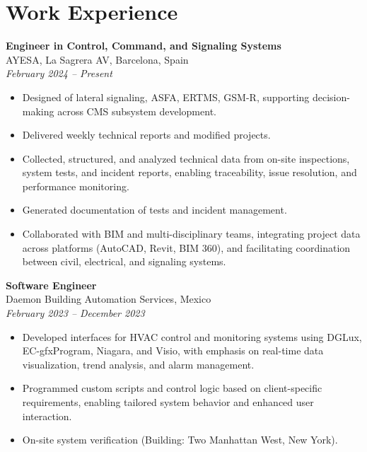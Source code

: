 \documentclass[11pt,a4paper]{article}
\begin{document}
\begin{minipage}[t]{0.65\textwidth}
\justifying

\vspace*{-14.5em}

\section*{Work Experience}
\footnotesize

\textbf{Engineer in Control, Command, and Signaling Systems} \\
AYESA, La Sagrera AV, Barcelona, Spain \\
\textit{February 2024 -- Present}
\begin{itemize}
    \item Designed of lateral signaling, ASFA, ERTMS, GSM-R, supporting decision-making across CMS subsystem development.
    \item Delivered weekly technical reports and modified projects.
    \item Collected, structured, and analyzed technical data from on-site inspections, system tests, and incident reports, enabling traceability, issue resolution, and performance monitoring.
    \item Generated documentation of tests and incident management.
    \item Collaborated with BIM and multi-disciplinary teams, integrating project data across platforms (AutoCAD, Revit, BIM 360), and facilitating coordination between civil, electrical, and signaling systems.
\end{itemize}

\vspace{1em}

\textbf{Software Engineer} \\
Daemon Building Automation Services, Mexico \\
\textit{February 2023 -- December 2023}
\begin{itemize}
    \item Developed interfaces for HVAC control and monitoring systems using DGLux, EC-gfxProgram, Niagara, and Visio, with emphasis on real-time data visualization, trend analysis, and alarm management.
    \item Programmed custom scripts and control logic based on client-specific requirements, enabling tailored system behavior and enhanced user interaction.
    \item On-site system verification (Building: Two Manhattan West, New York).
\end{itemize}


\end{minipage}
\end{document}
